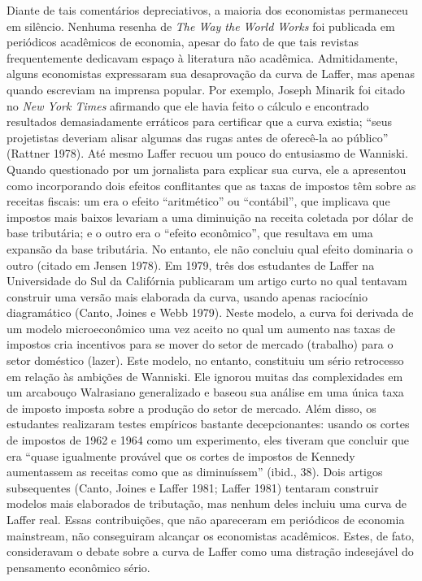 \documentclass[a4paper,12pt]{article}[abntex2]
\begin{document}
Diante de tais comentários depreciativos, a maioria dos economistas permaneceu em silêncio. Nenhuma resenha de \textit{The Way the World Works} foi publicada em periódicos acadêmicos de economia, apesar do fato de que tais revistas frequentemente dedicavam espaço à literatura não acadêmica. Admitidamente, alguns economistas expressaram sua desaprovação da curva de Laffer, mas apenas quando escreviam na imprensa popular. Por exemplo, Joseph Minarik foi citado no \textit{New York Times} afirmando que ele havia feito o cálculo e encontrado resultados demasiadamente erráticos para certificar que a curva existia; ``seus projetistas deveriam alisar algumas das rugas antes de oferecê-la ao público'' (Rattner 1978). Até mesmo Laffer recuou um pouco do entusiasmo de Wanniski. Quando questionado por um jornalista para explicar sua curva, ele a apresentou como incorporando dois efeitos conflitantes que as taxas de impostos têm sobre as receitas fiscais: um era o efeito ``aritmético'' ou ``contábil'', que implicava que impostos mais baixos levariam a uma diminuição na receita coletada por dólar de base tributária; e o outro era o ``efeito econômico'', que resultava em uma expansão da base tributária. No entanto, ele não concluiu qual efeito dominaria o outro (citado em Jensen 1978). Em 1979, três dos estudantes de Laffer na Universidade do Sul da Califórnia publicaram um artigo curto no qual tentavam construir uma versão mais elaborada da curva, usando apenas raciocínio diagramático (Canto, Joines e Webb 1979). Neste modelo, a curva foi derivada de um modelo microeconômico uma vez aceito no qual um aumento nas taxas de impostos cria incentivos para se mover do setor de mercado (trabalho) para o setor doméstico (lazer). Este modelo, no entanto, constituiu um sério retrocesso em relação às ambições de Wanniski. Ele ignorou muitas das complexidades em um arcabouço Walrasiano generalizado e baseou sua análise em uma única taxa de imposto imposta sobre a produção do setor de mercado. Além disso, os estudantes realizaram testes empíricos bastante decepcionantes: usando os cortes de impostos de 1962 e 1964 como um experimento, eles tiveram que concluir que era ``quase igualmente provável que os cortes de impostos de Kennedy aumentassem as receitas como que as diminuíssem'' (ibid., 38). Dois artigos subsequentes (Canto, Joines e Laffer 1981; Laffer 1981) tentaram construir modelos mais elaborados de tributação, mas nenhum deles incluiu uma curva de Laffer real. Essas contribuições, que não apareceram em periódicos de economia mainstream, não conseguiram alcançar os economistas acadêmicos. Estes, de fato, consideravam o debate sobre a curva de Laffer como uma distração indesejável do pensamento econômico sério.
\end{document}
